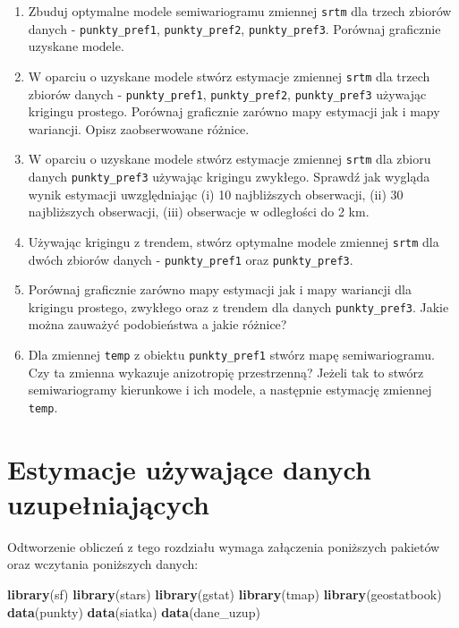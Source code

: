 \documentclass[
  paper=6in:9in,pagesize=pdftex,headinclude=on,footinclude=on,10pt]{scrbook}
\newenvironment{Shaded}{\begin{snugshade}}{\end{snugshade}}
\newcommand{\FunctionTok}[1]{\textcolor[rgb]{0.13,0.29,0.53}{\textbf{#1}}}
\newcommand{\NormalTok}[1]{#1}
\providecommand{\tightlist}{%
  \setlength{\itemsep}{0pt}\setlength{\parskip}{0pt}}
\begin{document}
\begin{enumerate}
\def\labelenumi{\arabic{enumi}.}
\tightlist
\item
  Zbuduj optymalne modele semiwariogramu zmiennej \texttt{srtm} dla trzech zbiorów danych - \texttt{punkty\_pref1}, \texttt{punkty\_pref2}, \texttt{punkty\_pref3}.
  Porównaj graficznie uzyskane modele.
\item
  W oparciu o uzyskane modele stwórz estymacje zmiennej \texttt{srtm} dla trzech zbiorów danych - \texttt{punkty\_pref1}, \texttt{punkty\_pref2}, \texttt{punkty\_pref3} używając krigingu prostego.
  Porównaj graficznie zarówno mapy estymacji jak i mapy wariancji.
  Opisz zaobserwowane różnice.
\item
  W oparciu o uzyskane modele stwórz estymacje zmiennej \texttt{srtm} dla zbioru danych \texttt{punkty\_pref3} używając krigingu zwykłego.
  Sprawdź jak wygląda wynik estymacji uwzględniając (i) 10 najbliższych obserwacji, (ii) 30 najbliższych obserwacji, (iii) obserwacje w odległości do 2 km.
\item
  Używając krigingu z trendem, stwórz optymalne modele zmiennej \texttt{srtm} dla dwóch zbiorów danych - \texttt{punkty\_pref1} oraz \texttt{punkty\_pref3}.
\item
  Porównaj graficznie zarówno mapy estymacji jak i mapy wariancji dla krigingu prostego, zwykłego oraz z trendem dla danych \texttt{punkty\_pref3}.
  Jakie można zauważyć podobieństwa a jakie różnice?
\item
  Dla zmiennej \texttt{temp} z obiektu \texttt{punkty\_pref1} stwórz mapę semiwariogramu.
  Czy ta zmienna wykazuje anizotropię przestrzenną?
  Jeżeli tak to stwórz semiwariogramy kierunkowe i ich modele, a następnie estymację zmiennej \texttt{temp}.
\end{enumerate}

\chapter{Estymacje używające danych uzupełniających}\label{wykorzystanie-do-estymacji-danych-uzupeniajacych}

Odtworzenie obliczeń z tego rozdziału wymaga załączenia poniższych pakietów oraz wczytania poniższych danych:

\begin{Shaded}
\begin{Highlighting}[]
\FunctionTok{library}\NormalTok{(sf)}
\FunctionTok{library}\NormalTok{(stars)}
\FunctionTok{library}\NormalTok{(gstat)}
\FunctionTok{library}\NormalTok{(tmap)}
\FunctionTok{library}\NormalTok{(geostatbook)}
\FunctionTok{data}\NormalTok{(punkty)}
\FunctionTok{data}\NormalTok{(siatka)}
\FunctionTok{data}\NormalTok{(dane\_uzup)}
\end{Highlighting}
\end{Shaded}
\end{document}

